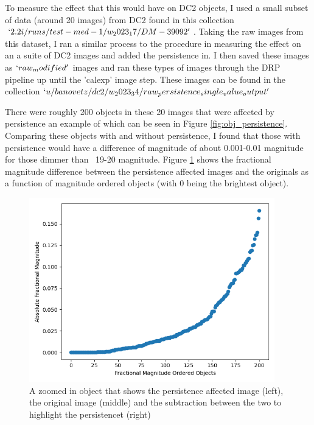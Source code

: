 \documentclass[DM,authoryear,toc]{lsstdoc}
\begin{document}
To measure the effect that this would have on DC2 objects, I used a small subset of data (around 20 images) from DC2 
found in this collection \texttt{$`2.2i/runs/test-med-1/w_2023_17/DM-39092'$}. 
Taking the raw images from this dataset, 
I ran a similar process to the procedure in measuring the effect on an a suite of DC2 images and added the persistence in. 
I then saved these images as \texttt{$`raw_modified'$} images and ran these types of images through the DRP pipeline up until the 'calexp' image step.
These images can be found in the collection \texttt{$`u/banovetz/dc2/w_2023_34/raw_persistence_single_value_output'$}

There were roughly 200 objects in these 20 images that were affected by persistence an example of which can be seen in Figure \ref{fig:obj_persistence}.
Comparing these objects with and without persistence, 
I found that those with persistence would have a difference of magnitude of about 0.001-0.01 magnitude for those dimmer than ~19-20 magnitude. 
Figure \ref{fig:absolute_fractional_flux} shows the fractional magnitude difference between the persistence affected images and the originals
 as a function of magnitude ordered objects (with 0 being the brightest object).

\begin{figure}[!htp]
  \centering
  \includegraphics[width=0.95\textwidth, angle=0]{Absolute_Fractional_Magnitude.png}
  \caption{
  A zoomed in object that shows the persistence affected image (left), the original image (middle) 
  and the subtraction between the two to highlight the persistencet (right)
  }\label{fig:absolute_fractional_flux}
\end{figure}
\end{document}
